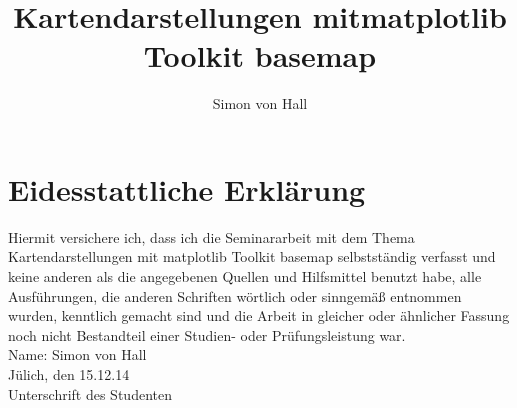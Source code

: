 \documentclass[a4paper,11pt]{article}
\title{Kartendarstellungen mit\newline matplotlib Toolkit basemap}
\author{Simon von Hall}
\begin{document}
\maketitle
\clearpage
\section{Eidesstattliche Erklärung}
Hiermit versichere ich, dass ich die Seminararbeit mit dem Thema Kartendarstellungen mit  \textsf{matplotlib Toolkit basemap} selbstständig verfasst und keine anderen als die angegebenen Quellen und Hilfsmittel benutzt habe, alle Ausführungen, die anderen Schriften
wörtlich oder sinngemäß entnommen wurden, kenntlich gemacht sind und
die Arbeit in gleicher oder ähnlicher Fassung noch nicht Bestandteil einer
Studien- oder Prüfungsleistung war.\\

Name: Simon von Hall\\

Jülich, den 15.12.14\\

Unterschrift des Studenten
\clearpage
\tableofcontents
\clearpage

\newpage
\newpage
\newpage
\newpage
\newpage
\newpage
\end{document}
